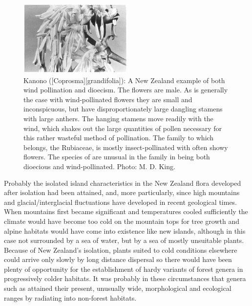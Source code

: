 \begin{figure}
	\includegraphics[width=0.5\textwidth]{graphics/figure5kanono.jpg}
	\centering
	\caption[Kanono: A New Zealand example of both wind pollination and dioecism]{Kanono ([Coprosma][grandifolia]): A New Zealand example of both wind pollination and dioecism.
	The flowers are male.
	As is generally the case with wind-pollinated flowers they are small and inconspicuous, but have disproportionately large dangling stamens with large anthers.
	The hanging stamens move readily with the wind, which shakes out the large quantities of pollen necessary for this rather wasteful method of pollination.
	The family to which  belongs, the Rubiaceae, is mostly insect-pollinated with often showy flowers.
	The species of  are unusual in the family in being both dioecious and wind-pollinated.
	Photo: M. D. King.}%
	\label{fig:5kanono}
\end{figure}

Probably the isolated island characteristics in the New Zealand flora developed after isolation had been attained, and, more particularly, since high mountains and glacial/interglacial fluctuations have developed in recent geological times.
When mountains first became significant and temperatures cooled sufficiently the climate would have become too cold on the mountain tops for tree growth and alpine habitats would have come into existence like new islands, although in this case not surrounded by a sea of water, but by a sea of mostly unsuitable plants.
Because of New Zealand's isolation, plants suited to cold conditions elsewhere could arrive only slowly by long distance dispersal so there would have been plenty of opportunity for the establishment of hardy variants of forest genera in progressively colder habitats.
It was probably in these circumstances that genera such as  attained their present, unusually wide, morphological and ecological ranges by radiating into non-forest habitats.

